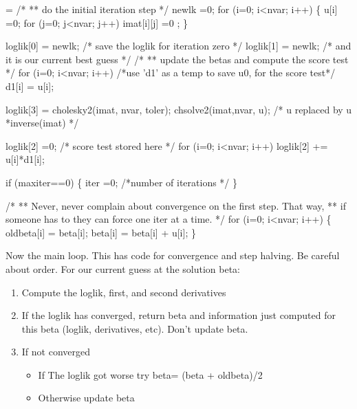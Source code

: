 \documentclass{article}
\begin{document}
\begin{nwchunk}
=
 /*
 ** do the initial iteration step
 */
 newlk =0;
 for (i=0; i<nvar; i++) \{
     u[i] =0;
     for (j=0; j<nvar; j++)
         imat[i][j] =0 ;
     \}
 
 loglik[0] = newlk;   /* save the loglik for iteration zero  */
 loglik[1] = newlk;  /* and it is our current best guess */
 /* 
 **   update the betas and compute the score test 
 */
 for (i=0; i<nvar; i++) /*use 'd1' as a temp to save u0, for the score test*/
     d1[i] = u[i];
 
 loglik[3] = cholesky2(imat, nvar, toler);
 chsolve2(imat,nvar, u);        /* u replaced by  u *inverse(imat) */
 
 loglik[2] =0;                  /* score test stored here */
 for (i=0; i<nvar; i++)
     loglik[2] +=  u[i]*d1[i];
 
 if (maxiter==0) \{
     iter =0;  /*number of iterations */
     \}
 
 /*
 **  Never, never complain about convergence on the first step.  That way,
 **  if someone has to they can force one iter at a time.
 */
 for (i=0; i<nvar; i++) \{
     oldbeta[i] = beta[i];
     beta[i] = beta[i] + u[i];
     \}
\end{nwchunk}

Now the main loop.  This has code for convergence and step halving.
Be careful about order.  For our current guess at the solution
beta:
\begin{enumerate}
  \item Compute the loglik, first, and second derivatives
  \item If the loglik has converged, return beta and information
    just computed for this beta (loglik, derivatives, etc).  
    Don't update beta.          %
  \item If not converged
    \begin{itemize}
      \item If The loglik got worse try beta= (beta + oldbeta)/2
      \item Otherwise update beta
     \end{itemize}
\end{enumerate}
\end{document}
